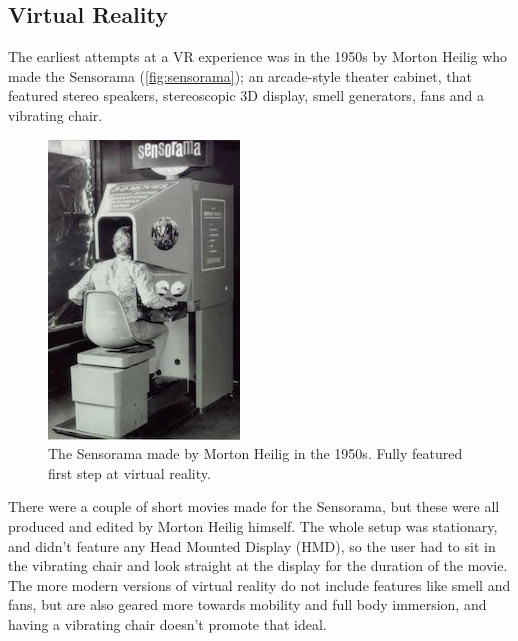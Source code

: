 		\subsection{Virtual Reality}\label{sec:virtualReality}
		The earliest attempts at a VR experience was in the 1950s\cite{VRS} by Morton Heilig who made the Sensorama (\autoref{fig:sensorama}); an arcade-style theater cabinet, that featured stereo speakers, stereoscopic 3D display, smell generators, fans and a vibrating chair.
		\begin{figure}[H]
			\centering
			\includegraphics[width=0.4\linewidth]{figure/Analysis/sensorama2}
			\caption{The Sensorama made by Morton Heilig in the 1950s. Fully featured first step at virtual reality.}
			\label{fig:sensorama}
		\end{figure}
		There were a couple of short movies made for the Sensorama, but these were all produced and edited by Morton Heilig himself. The whole setup was stationary, and didn't feature any Head Mounted Display (HMD), so the user had to sit in the vibrating chair and look straight at the display for the duration of the movie. The more modern versions of virtual reality do not include features like smell and fans, but are also geared more towards mobility and full body immersion, and having a vibrating chair doesn't promote that ideal.\\
		
